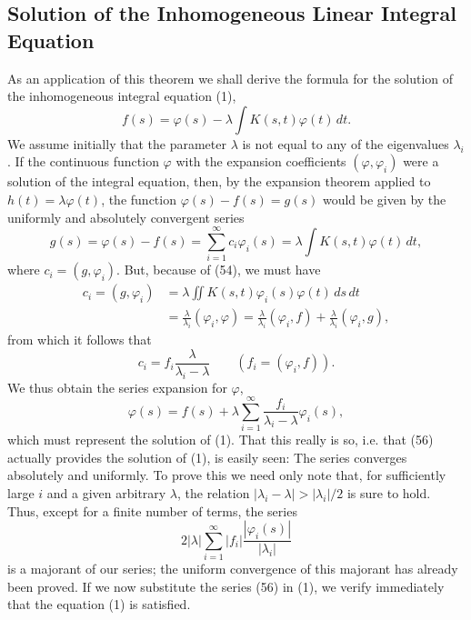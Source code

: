 \subsection{Solution of the Inhomogeneous Linear Integral Equation}
As an application of this theorem we shall derive the formula for the solution of the inhomogeneous integral equation (1),
\[
f(s)=\varphi(s)-\lambda\int K(s,t)\varphi(t)\,dt.
\]
We assume initially that the parameter $\lambda$ is not equal to any of the eigenvalues $\lambda_i$. If the continuous function $\varphi$ with the expansion coefficients $(\varphi,\varphi_i)$ were a solution of the integral equation, then, by the expansion theorem applied to $h(t)=\lambda\varphi(t)$, the function $\varphi(s)-f(s)=g(s)$ would be given by the uniformly and absolutely convergent series
\begin{equation}\tag{54}
g(s)=\varphi(s)-f(s)=\sum_{i=1}^{\infty}c_i\varphi_i(s)
=\lambda\int K(s,t)\varphi(t)\,dt,
\end{equation}
where $c_i=(g,\varphi_i)$. But, because of (54), we must have
\[
\begin{aligned}
c_i=(g,\varphi_i)
&=\lambda\iint K(s,t)\varphi_i(s)\varphi(t)\,ds\,dt\\
&=\frac{\lambda}{\lambda_i}(\varphi_i,\varphi)
=\frac{\lambda}{\lambda_i}(\varphi_i,f)
+\frac{\lambda}{\lambda_i}(\varphi_i,g),
\end{aligned}
\]
from which it follows that
\begin{equation}\tag{55}
c_i=f_i\frac{\lambda}{\lambda_i-\lambda}
\qquad(f_i=(\varphi_i,f)).
\end{equation}
We thus obtain the series expansion for $\varphi$,
\begin{equation}\tag{56}
\varphi(s)=f(s)+\lambda\sum_{i=1}^{\infty}\frac{f_i}{\lambda_i-\lambda}\varphi_i(s),
\end{equation}
which must represent the solution of (1). That this really is so, i.e. that (56) actually provides the solution of (1), is easily seen: The series converges absolutely and uniformly. To prove this we need only note that, for sufficiently large $i$ and a given arbitrary $\lambda$, the relation $|\lambda_i-\lambda|>|\lambda_i|/2$ is sure to hold. Thus, except for a finite number of terms, the series
\[
2|\lambda|\sum_{i=1}^{\infty}|f_i|\frac{|\varphi_i(s)|}{|\lambda_i|}
\]
is a majorant of our series; the uniform convergence of this majorant has already been proved. If we now substitute the series (56) in (1), we verify immediately that the equation (1) is satisfied.

